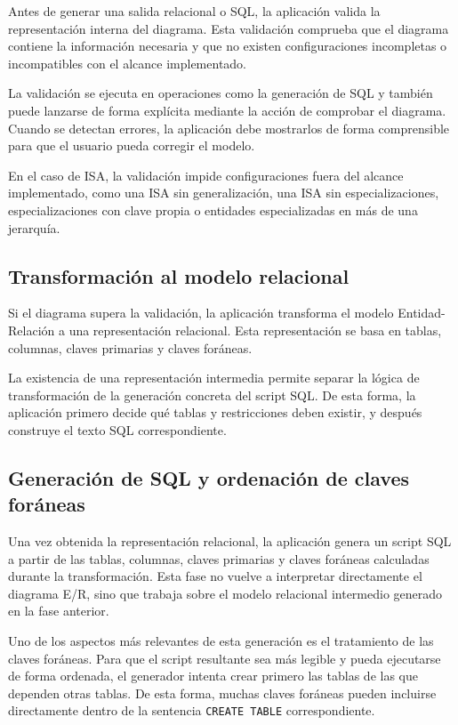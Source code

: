 Antes de generar una salida relacional o SQL, la aplicación valida la representación interna del diagrama. Esta validación comprueba que el diagrama contiene la información necesaria y que no existen configuraciones incompletas o incompatibles con el alcance implementado.

La validación se ejecuta en operaciones como la generación de SQL y también puede lanzarse de forma explícita mediante la acción de comprobar el diagrama. Cuando se detectan errores, la aplicación debe mostrarlos de forma comprensible para que el usuario pueda corregir el modelo.

En el caso de ISA, la validación impide configuraciones fuera del alcance implementado, como una ISA sin generalización, una ISA sin especializaciones, especializaciones con clave propia o entidades especializadas en más de una jerarquía.

\subsection{Transformación al modelo relacional}

Si el diagrama supera la validación, la aplicación transforma el modelo Entidad-Relación a una representación relacional. Esta representación se basa en tablas, columnas, claves primarias y claves foráneas.

La existencia de una representación intermedia permite separar la lógica de transformación de la generación concreta del script SQL. De esta forma, la aplicación primero decide qué tablas y restricciones deben existir, y después construye el texto SQL correspondiente.

\subsection{Generación de SQL y ordenación de claves foráneas}

Una vez obtenida la representación relacional, la aplicación genera un script SQL a partir de las tablas, columnas, claves primarias y claves foráneas calculadas durante la transformación. Esta fase no vuelve a interpretar directamente el diagrama E/R, sino que trabaja sobre el modelo relacional intermedio generado en la fase anterior.

Uno de los aspectos más relevantes de esta generación es el tratamiento de las claves foráneas. Para que el script resultante sea más legible y pueda ejecutarse de forma ordenada, el generador intenta crear primero las tablas de las que dependen otras tablas. De esta forma, muchas claves foráneas pueden incluirse directamente dentro de la sentencia \texttt{CREATE TABLE} correspondiente.

